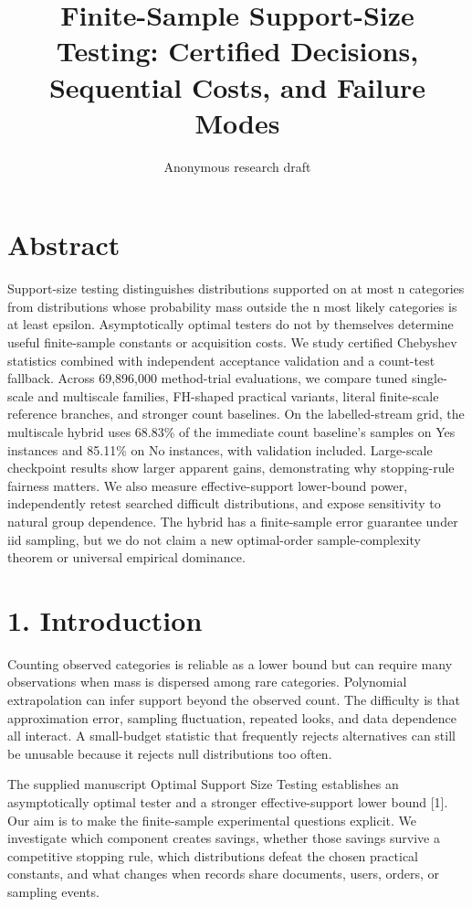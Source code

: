 \documentclass[10pt]{article}
\title{Finite-Sample Support-Size Testing: Certified Decisions, Sequential Costs, and Failure Modes}
\author{Anonymous research draft}
\date{}
\begin{document}
\maketitle
\section*{Abstract}
Support-size testing distinguishes distributions supported on at most n categories from distributions whose probability mass outside the n most likely categories is at least epsilon. Asymptotically optimal testers do not by themselves determine useful finite-sample constants or acquisition costs. We study certified Chebyshev statistics combined with independent acceptance validation and a count-test fallback. Across 69,896,000 method-trial evaluations, we compare tuned single-scale and multiscale families, FH-shaped practical variants, literal finite-scale reference branches, and stronger count baselines. On the labelled-stream grid, the multiscale hybrid uses 68.83\% of the immediate count baseline's samples on Yes instances and 85.11\% on No instances, with validation included. Large-scale checkpoint results show larger apparent gains, demonstrating why stopping-rule fairness matters. We also measure effective-support lower-bound power, independently retest searched difficult distributions, and expose sensitivity to natural group dependence. The hybrid has a finite-sample error guarantee under iid sampling, but we do not claim a new optimal-order sample-complexity theorem or universal empirical dominance.

\section*{1. Introduction}
Counting observed categories is reliable as a lower bound but can require many observations when mass is dispersed among rare categories. Polynomial extrapolation can infer support beyond the observed count. The difficulty is that approximation error, sampling fluctuation, repeated looks, and data dependence all interact. A small-budget statistic that frequently rejects alternatives can still be unusable because it rejects null distributions too often.

The supplied manuscript Optimal Support Size Testing establishes an asymptotically optimal tester and a stronger effective-support lower bound [1]. Our aim is to make the finite-sample experimental questions explicit. We investigate which component creates savings, whether those savings survive a competitive stopping rule, which distributions defeat the chosen practical constants, and what changes when records share documents, users, orders, or sampling events.
\end{document}

